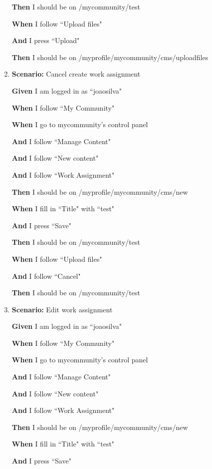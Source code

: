 \begin{enumerate}
    \textbf{Then} I should be on /mycommunity/test
   
    \textbf{When} I follow ``Upload files"
   
    \textbf{And} I press ``Upload"
   
    \textbf{Then} I should be on /myprofile/mycommunity/cms/uploadfiles

\item \textbf{Scenario:} Cancel create work assignment
    
    \textbf{Given} I am logged in as ``joaosilva"
    
    \textbf{When} I follow ``My Community"
    
    \textbf{When} I go to mycommunity's control panel
    
    \textbf{And}  I follow ``Manage Content"
    
    \textbf{And}  I follow ``New content"
    
    \textbf{And}  I follow ``Work Assignment"
    
    \textbf{Then} I should be on /myprofile/mycommunity/cms/new
    
    \textbf{When} I fill in ``Title" with ``test"
    
    \textbf{And}  I press ``Save"
    
    \textbf{Then} I should be on /mycommunity/test
    
    \textbf{When} I follow ``Upload files"
    
    \textbf{And}  I follow ``Cancel"
    
    \textbf{Then} I should be on /mycommunity/test

\item \textbf{Scenario:} Edit work assignment 
    
    \textbf{Given} I am logged in as ``joaosilva"
    
    \textbf{When} I follow ``My Community"
    
    \textbf{When} I go to mycommunity's control panel
    
    \textbf{And} I follow ``Manage Content"
    
    \textbf{And} I follow ``New content"
    
    \textbf{And} I follow ``Work Assignment"
    
    \textbf{Then} I should be on /myprofile/mycommunity/cms/new
    
    \textbf{When} I fill in ``Title" with ``test"
    
    \textbf{And} I press ``Save"
    

\end{enumerate}
